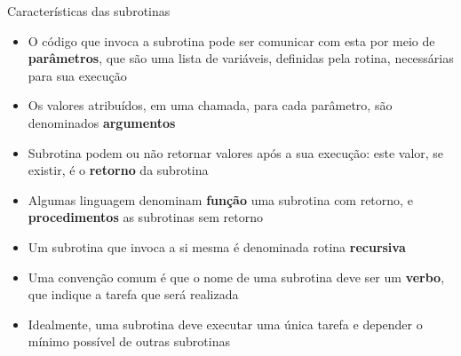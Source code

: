 \begin{frame}[fragile]{Características das subrotinas}

    \begin{itemize}

        \item O código que invoca a subrotina pode ser comunicar com esta por meio de 
            \textbf{parâmetros}, que são uma lista de variáveis, definidas pela rotina, necessárias
            para sua execução

        \item Os valores atribuídos, em uma chamada, para cada parâmetro, são denominados
            \textbf{argumentos}

        \item Subrotina podem ou não retornar valores após a sua execução: este valor, se existir,              é o \textbf{retorno} da subrotina

        \item Algumas linguagem denominam \textbf{função} uma subrotina com retorno, e 
            \textbf{procedimentos} as subrotinas sem retorno

        \item Um subrotina que invoca a si mesma é denominada rotina \textbf{recursiva}

        \item Uma convenção comum é que o nome de uma subrotina deve ser um \textbf{verbo}, que
            indique a tarefa que será realizada

        \item Idealmente, uma subrotina deve executar uma única tarefa e depender o mínimo possível
            de outras subrotinas
    \end{itemize}

\end{frame}
